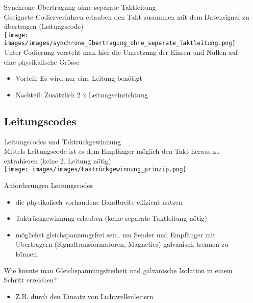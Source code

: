 \begin{concept}{Synchrone Übertragung ohne separate Taktleitung}\\
    Geeignete Codierverfahren erlauben den Takt zusammen mit dem Datensignal zu übertragen (Leitungscode)\\
    \texttt{[image: images/images/synchrone\_übertragung\_ohne\_seperate\_Taktleitung.png]}\\
    Unter Codierung versteht man hier die Umsetzung der Einsen und Nullen auf eine physikalische Grösse
    \begin{itemize}
        \item Vorteil: Es wird nur eine Leitung benötigt
        \item Nachteil: Zusätzlich 2 x Leitungseinrichtung
    \end{itemize}
\end{concept}


\subsection{Leitungscodes}

\begin{definition}{Leitungscodes und Taktrückgewinnung}\\
    Mittels Leitungscode ist es dem Empfänger möglich den Takt heraus zu extrahieren (keine 2. Leitung nötig)\\
    \texttt{[image: images/images/taktrückgewinnung\_prinzip.png]}
\end{definition}

\begin{theorem}{Anforderungen Leitungscodes}
\begin{itemize}
    \item die physikalisch vorhandene Bandbreite effizient nutzen
    \item Taktrückgewinnung erlauben (keine separate Taktleitung nötig)
    \item möglichst gleichspannungsfrei sein, um Sender und Empfänger mit Übertragern (Signaltransformatoren, Magnetics) galvanisch trennen zu können.
\end{itemize} 
\end{theorem}

\begin{example}
    Wie könnte man Gleichspannungsfreiheit und galvanische Isolation in einem Schritt erreichen?
    \begin{itemize}
        \item Z.B. durch den Einsatz von Lichtwellenleitern
    \end{itemize}
\end{example}


